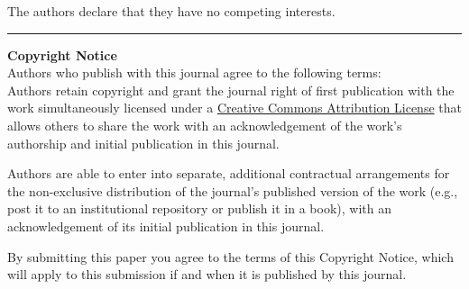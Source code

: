 \documentclass{../jors}
\begin{document}
The authors declare that they have no competing interests.








\rule{\textwidth}{1pt}

{ \bf Copyright Notice} \\
Authors who publish with this journal agree to the following terms: \\

Authors retain copyright and grant the journal right of first publication with
the work simultaneously licensed under a
\href{http://creativecommons.org/licenses/by/3.0/}{Creative Commons Attribution
License} that allows others to share the work with an acknowledgement of the
work's authorship and initial publication in this journal.

Authors are able to enter into separate, additional contractual arrangements
for the non-exclusive distribution of the journal's published version of the
work (e.g., post it to an institutional repository or publish it in a book),
with an acknowledgement of its initial publication in this journal.

By submitting this paper you agree to the terms of this Copyright Notice, which
will apply to this submission if and when it is published by this journal.
\end{document}
